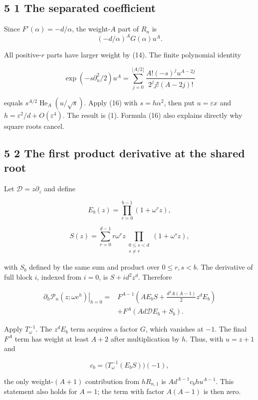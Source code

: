 \documentclass[
  11pt,
]{article}
\begin{document}
\subsection{5 1 The separated
coefficient}\label{the-separated-coefficient}

Since \(F'(\alpha)=-d/\alpha\), the weight-\(A\) part of \(R_n\) is
\nopagebreak[4]
\[
(-d/\alpha)^A G(\alpha)u^A.
\]

All positive-\(r\) parts have larger weight by (14). The finite
polynomial identity

\[
\exp(-s\partial_u^2/2)u^A
=\sum_{j=0}^{\lfloor A/2\rfloor}
\frac{A!(-s)^j u^{A-2j}}{2^j j!(A-2j)!} \tag{16}
\]

equals \(s^{A/2}\operatorname{He}_A(u/\sqrt s)\). Apply (16) with
\(s=h\alpha^2\), then put \(u=\varepsilon x\) and
\(h=\varepsilon^2/d+O(\varepsilon^4)\). The result is (1). Formula (16)
also explains directly why square roots cancel.

\subsection{5 2 The first product derivative at the shared
root}\label{the-first-product-derivative-at-the-shared-root}

Let \(\mathcal D=z\partial_z\) and define

\[
E_b(z)=\prod_{r=0}^{b-1}(1+\omega^rz),
\]

\[
S(z)=\sum_{r=0}^{d-1}r\omega^rz
\prod_{\substack{0\leq s<d\\s\ne r}}(1+\omega^sz),
\]

with \(S_b\) defined by the same sum and product over \(0\leq r,s<b\).
The derivative of full block \(i\), indexed from \(i=0\), is
\(S+id^2z^d\). Therefore

\[
\begin{aligned}
\left.\partial_h\mathcal P_n(z;\omega e^h)\right|_{h=0}
={}&F^{A-1}\left(AE_bS+\frac{d^2A(A-1)}2z^dE_b\right)\\
&+F^A\left(Ad\mathcal D E_b+S_b\right).
\end{aligned} \tag{17}
\]

Apply \(T_\omega^{-1}\). The \(z^dE_b\) term acquires a factor \(G\),
which vanishes at \(-1\). The final \(F^A\) term has weight at least
\(A+2\) after multiplication by \(h\). Thus, with \(u=z+1\) and

\[
c_b=\bigl(T_\omega^{-1}(E_bS)\bigr)(-1),
\]

the only weight-\((A+1)\) contribution from \(hR_{n,1}\) is
\(Ad^{A-1}c_bhu^{A-1}\). This statement also holds for \(A=1\); the term
with factor \(A(A-1)\) is then zero.
\end{document}
